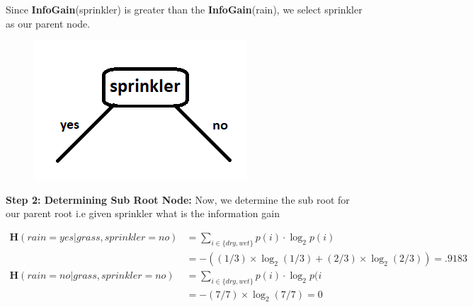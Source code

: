 \documentclass[10pt,a4paper]{article}
\newcommand{\h}{\textbf{H}}
\newcommand{\ig}{\textbf{InfoGain}}
\newcommand{\sdw}{\displaystyle{ \sum_{i \in \{dry, wet\}} }}
\begin{document}
\begin{enumerate}
		Since \ig(sprinkler) is greater than the \ig(rain), we select sprinkler as our parent node.
		\begin{figure}[h!]
			\centering
			\includegraphics[scale=.5]{pnode}
		\end{figure}
		
		\textbf{Step 2: Determining Sub Root Node:} \newline
		Now, we determine the sub root for our parent root i.e given sprinkler what is the information gain
		
			
			\begin{equation*}
				\begin{split}
					\h(rain=yes | grass, sprinkler = no) & = \sdw p(i) \cdot \log_2 p(i) \\
					& = -( (1/3)\times\log_2(1/3) + (2/3)\times\log_2(2/3) ) = .9183 \\
					\h(rain=no | grass, sprinkler = no) & = \sdw p(i) \cdot \log_2 p(i \\
					& = - (7/7)\times\log_2(7/7) = 0 \\
				\end{split}
			\end{equation*}
		

\end{enumerate}
\end{document}
